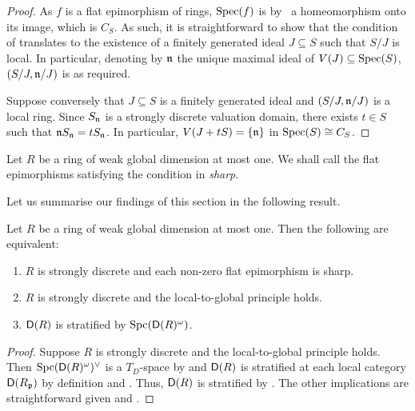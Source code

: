 \documentclass[reqno,a4paper]{amsart}
\begin{document}
\begin{proof}
    As $f$ is a flat epimorphism of rings, $\operatorname{Spec}(f)$ is by~\cite[Corollaire~IV.2.2]{Lazard:1969} a homeomorphism onto its image, which is $C_S$. As such, it is straightforward to show that the condition of  translates to the existence of a finitely generated ideal $J\subseteq S$ such that $S/J$ is local.
    In particular, denoting by $\mathfrak{n}$ the unique maximal ideal of $V(J)\subseteq\operatorname{Spec}(S)$, $(S/J,\mathfrak{n}/J)$ is as required.

    Suppose conversely that $J\subseteq S$ is a finitely generated ideal and $(S/J,\mathfrak{n}/J)$ is a local ring. Since $S_{\mathfrak{n}}$ is a strongly discrete valuation domain, there exists $t\in S$ such that $\mathfrak{n} S_{\mathfrak{n}}=t S_{\mathfrak{n}}$. In particular, $V(J+tS)=\{\mathfrak{n}\}$ in $\operatorname{Spec}(S)\cong C_S$.
\end{proof}
\begin{definition}\label{def:sharpepi}
Let $R$ be a ring of weak global dimension at most one. We shall call the flat epimorphisms satisfying the condition in  \emph{sharp}.
\end{definition}
Let us summarise our findings of this section in the following result.
\begin{theorem}\label{thm:wgld1strat}
    Let $R$ be a ring of weak global dimension at most one. Then the following are equivalent:
    \begin{enumerate}
        \item $R$ is strongly discrete and each non-zero flat epimorphism is sharp.
        \item $R$ is strongly discrete and the local-to-global principle holds.
        \item $\mathsf{D}(R)$ is stratified by $\operatorname{Spc}(\mathsf{D}(R)^\omega)$.
    \end{enumerate}
\end{theorem}
 \begin{proof}
    Suppose $R$ is strongly discrete and the local-to-global principle holds. Then $\operatorname{Spc}(\mathsf{D}(R)^\omega)^\vee$ is a $T_D$-space by  and $\mathsf{D}(R)$ is stratified at each local category $\mathsf{D}(R_{\mathfrak{p}})$ by definition and . Thus, $\mathsf{D}(R)$ is stratified by \cite[Corollary 5.3]{bhs23}. The other implications are straightforward given  and .
 \end{proof}
\end{document}

